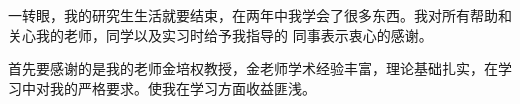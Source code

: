 
\begin{acknowledgements}

一转眼，我的研究生生活就要结束，在两年中我学会了很多东西。我对所有帮助和关心我的老师，同学以及实习时给予我指导的
同事表示衷心的感谢。

首先要感谢的是我的老师金培权教授，金老师学术经验丰富，理论基础扎实，在学习中对我的严格要求。使我在学习方面收益匪浅。


\end{acknowledgements}

